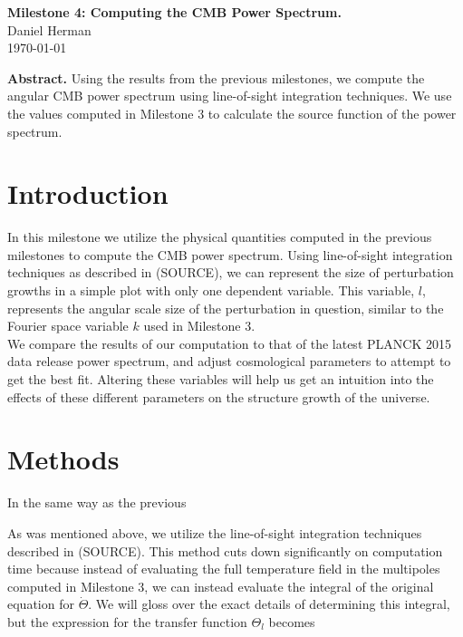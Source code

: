\documentclass[a4paper]{article}
\begin{document}
\begin{center}
  {\Large \bf Milestone 4: Computing the CMB Power Spectrum. }\\[4ex]
  {\large Daniel Herman}\\[4ex]
  \normalsize
  \today
  \vspace*{8ex}
      
  \begin{minipage}[t]{12cm}
      
  {\bf Abstract.} Using the results from the previous milestones, we compute the angular CMB power spectrum using line-of-sight integration techniques. We use the values computed in Milestone 3 to calculate the source function of the power spectrum.
  
  \vspace*{8ex}
  \end{minipage}

\end{center}

\section{Introduction}\label{sec:intro}

In this milestone we utilize the physical quantities computed in the previous milestones to compute the CMB power spectrum. Using line-of-sight integration techniques as described in (SOURCE), we can represent the size of perturbation growths in a simple plot with only one dependent variable. This variable, $l$, represents the angular scale size of the perturbation in question, similar to the Fourier space variable $k$ used in Milestone 3.\\

We compare the results of our computation to that of the latest PLANCK 2015 data release power spectrum, and adjust cosmological parameters to attempt to get the best fit. Altering these variables will help us get an intuition into the effects of these different parameters on the structure growth of the universe.

\section{Methods}\label{sec:meth}

In the same way as the previous 

As was mentioned above, we utilize the line-of-sight integration techniques described in (SOURCE). This method cuts down significantly on computation time because instead of evaluating the full temperature field in the multipoles computed in Milestone 3, we can instead evaluate the integral of the original equation for $\dot{\Theta}$. We will gloss over the exact details of determining this integral, but the expression for the transfer function $\Theta_l$ becomes
\end{document}
